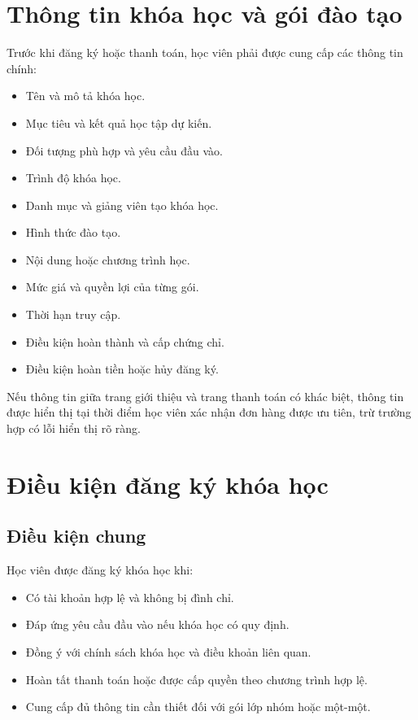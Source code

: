 \documentclass[12pt,a4paper]{article}
\begin{document}
\section{Thông tin khóa học và gói đào tạo}

Trước khi đăng ký hoặc thanh toán, học viên phải được cung cấp các thông tin chính:

\begin{itemize}
    \item Tên và mô tả khóa học.
    \item Mục tiêu và kết quả học tập dự kiến.
    \item Đối tượng phù hợp và yêu cầu đầu vào.
    \item Trình độ khóa học.
    \item Danh mục và giảng viên tạo khóa học.
    \item Hình thức đào tạo.
    \item Nội dung hoặc chương trình học.
    \item Mức giá và quyền lợi của từng gói.
    \item Thời hạn truy cập.
    \item Điều kiện hoàn thành và cấp chứng chỉ.
    \item Điều kiện hoàn tiền hoặc hủy đăng ký.
\end{itemize}

Nếu thông tin giữa trang giới thiệu và trang thanh toán có khác biệt,
thông tin được hiển thị tại thời điểm học viên xác nhận đơn hàng được ưu tiên,
trừ trường hợp có lỗi hiển thị rõ ràng.

\section{Điều kiện đăng ký khóa học}

\subsection{Điều kiện chung}

Học viên được đăng ký khóa học khi:

\begin{itemize}
    \item Có tài khoản hợp lệ và không bị đình chỉ.
    \item Đáp ứng yêu cầu đầu vào nếu khóa học có quy định.
    \item Đồng ý với chính sách khóa học và điều khoản liên quan.
    \item Hoàn tất thanh toán hoặc được cấp quyền theo chương trình hợp lệ.
    \item Cung cấp đủ thông tin cần thiết đối với gói lớp nhóm hoặc một-một.
\end{itemize}
\end{document}
